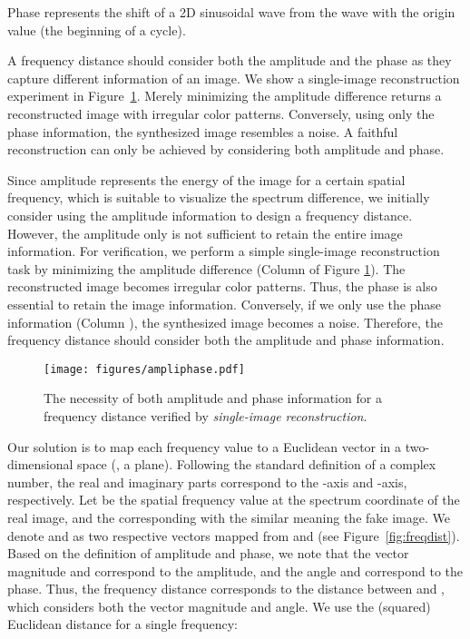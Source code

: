\documentclass[10pt,twocolumn,letterpaper]{article}
\begin{document}
Phase represents the shift of a 2D sinusoidal wave from the wave with the origin value (the beginning of a cycle).

A frequency distance should consider both the amplitude and the phase as they capture different information of an image.
We show a single-image reconstruction experiment in Figure~\ref{fig:ampliphase}.
Merely minimizing the amplitude difference returns a reconstructed image with irregular color patterns.
Conversely, using only the phase information, the synthesized image resembles a noise.
A faithful reconstruction can only be achieved by considering both amplitude and phase.

Since amplitude represents the energy of the image for a certain spatial frequency, which is suitable to visualize the spectrum difference, we initially consider using the amplitude information to design a frequency distance.
However, the amplitude only is not sufficient to retain the entire image information.
For verification, we perform a simple single-image reconstruction task by minimizing the amplitude difference (Column  of Figure \ref{fig:ampliphase}).
The reconstructed image becomes irregular color patterns.
Thus, the phase is also essential to retain the image information.
Conversely, if we only use the phase information (Column ), the synthesized image becomes a noise.
Therefore, the frequency distance should consider both the amplitude and phase information.
\fi


\begin{figure}[t]
	\centering
\texttt{[image: figures/ampliphase.pdf]}
\caption{The necessity of both amplitude and phase information for a frequency distance verified by \textit{single-image reconstruction}.}
	\label{fig:ampliphase}
	\vspace{-0.3cm}
\end{figure}




Our solution is to map each frequency value to a Euclidean vector in a two-dimensional space (\ie, a plane). Following the standard definition of a complex number, the real and imaginary parts correspond to the -axis and -axis, respectively.
Let  be the spatial frequency value at the spectrum coordinate  of the real image, and the corresponding  with the similar meaning \wrt the fake image.
We denote  and  as two respective vectors mapped from  and  (see Figure~\ref{fig:freqdist}).
Based on the definition of amplitude and phase, we note that the vector magnitude  and  correspond to the amplitude, and the angle  and  correspond to the phase.
Thus, the frequency distance corresponds to the distance between  and , which considers both the vector magnitude and angle.
We use the (squared) Euclidean distance for a single frequency:
\end{document}
